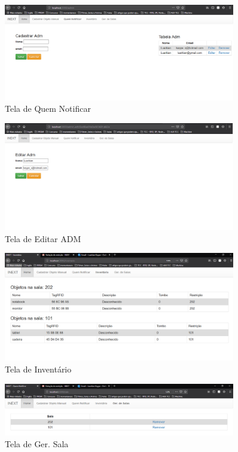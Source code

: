      \begin{figure}[H]
              \caption{\label{fig:tela_cadastro_manual}Tela de Quem Notificar}
              \centering
              \includegraphics[width=0.9\textwidth]{Figuras/tela_quem_notificar.PNG}
    \end{figure}
    
    \begin{figure}[H]
              \caption{\label{fig:tela_cadastro_manual}Tela de Editar ADM}
              \centering
              \includegraphics[width=0.9\textwidth]{Figuras/tela_editar_adm.png}
    \end{figure}
    
    \begin{figure}[H]
              \caption{\label{fig:tela_inventario}Tela de Inventário}
              \centering
              \includegraphics[width=0.9\textwidth]{Figuras/execution5d.png}
    \end{figure}
    
    \begin{figure}[H]
              \caption{\label{fig:tela_ger_sala}Tela de Ger. Sala}
              \centering
              \includegraphics[width=0.9\textwidth]{Figuras/execution5c.png}
    \end{figure}